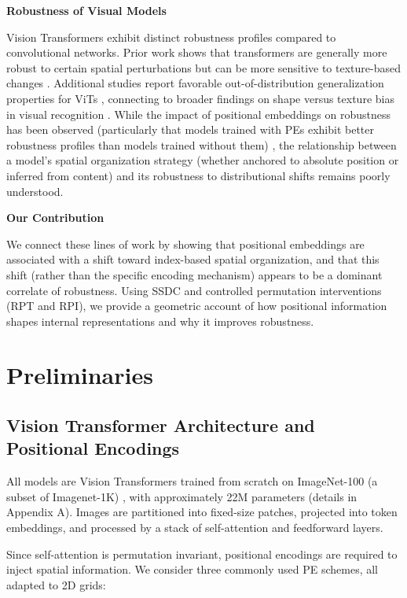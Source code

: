 \documentclass{article}
\begin{document}
\textbf{Robustness of Visual Models}

Vision Transformers exhibit distinct robustness profiles compared to convolutional networks. Prior work shows that transformers are generally more robust to certain spatial perturbations but can be more sensitive to texture-based changes \citep{Bhojanapalli2021robust}. Additional studies report favorable out-of-distribution generalization properties for ViTs \citep{Paul_Chen_2022}, connecting to broader findings on shape versus texture bias in visual recognition \citep{geirhos2018imagenettrained}. While the impact of positional embeddings on robustness has been observed (particularly that models trained with PEs exhibit better robustness profiles than models trained without them) \citep{Mao2021TowardsRV}, the relationship between a model’s spatial organization strategy (whether anchored to absolute position or inferred from content) and its robustness to distributional shifts remains poorly understood.

\textbf{Our Contribution}

We connect these lines of work by showing that positional embeddings are associated with a shift toward index-based spatial organization, and that this shift (rather than the specific encoding mechanism) appears to be a dominant correlate of robustness. Using SSDC and controlled permutation interventions (RPT and RPI), we provide a geometric account of how positional information shapes internal representations and why it improves robustness.

\section{Preliminaries}

\subsection{Vision Transformer Architecture and Positional Encodings}

All models are Vision Transformers trained from scratch on ImageNet-100 (a subset of Imagenet-1K) \citep{5206848}, with approximately 22M parameters (details in Appendix A). Images are partitioned into fixed-size patches, projected into token embeddings, and processed by a stack of self-attention and feedforward layers.

Since self-attention is permutation invariant, positional encodings are required to inject spatial information. We consider three commonly used PE schemes, all adapted to 2D grids:
\end{document}
